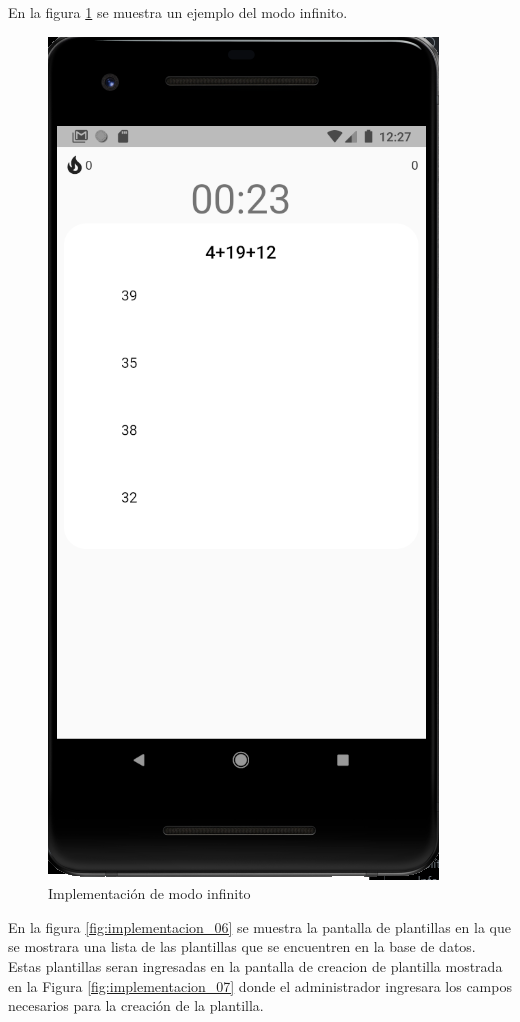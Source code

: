 \documentclass{article}
\begin{document}
En la figura \ref{fig:implementacion_05} se muestra un ejemplo del modo infinito.

\begin{figure}[H]
    \centering
    \includegraphics[scale=0.8]{imgs/Imp/Endless}
    \caption{Implementación de modo infinito}
    \label{fig:implementacion_05}
\end{figure}

En la figura \ref{fig:implementacion_06} se muestra la pantalla de plantillas en la 
que se mostrara una lista de las plantillas que se encuentren en la base de datos. 
Estas plantillas seran ingresadas en la pantalla de creacion de plantilla mostrada en
la Figura \ref{fig:implementacion_07} donde el administrador ingresara los campos 
necesarios para la creación de la plantilla.
\end{document}
